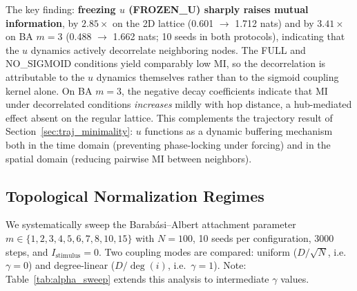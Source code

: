 ﻿\documentclass[11pt]{article}
\begin{document}
The key finding: \textbf{freezing $u$ (FROZEN\_U) sharply raises mutual information}, by $2.85\times$ on the 2D lattice (0.601 $\to$ 1.712 nats) and by $3.41\times$ on BA $m=3$ (0.488 $\to$ 1.662 nats; 10 seeds in both protocols), indicating that the $u$ dynamics actively decorrelate neighboring nodes. The FULL and NO\_SIGMOID conditions yield comparably low MI, so the decorrelation is attributable to the $u$ dynamics themselves rather than to the sigmoid coupling kernel alone. On BA $m=3$, the negative decay coefficients indicate that MI under decorrelated conditions \emph{increases} mildly with hop distance, a hub-mediated effect absent on the regular lattice. This complements the trajectory result of Section~\ref{sec:traj_minimality}: $u$ functions as a dynamic buffering mechanism both in the time domain (preventing phase-locking under forcing) and in the spatial domain (reducing pairwise MI between neighbors).

\subsection{Topological Normalization Regimes}
\label{sec:topo_regimes}

We systematically sweep the Barab\'asi--Albert attachment parameter $m \in \{1, 2, 3, 4, 5, 6, 7, 8, 10, 15\}$ with $N = 100$, 10 seeds per configuration, 3000 steps, and $I_{\text{stimulus}} = 0$. Two coupling modes are compared: uniform ($D/\sqrt{N}$, i.e.\ $\gamma = 0$) and degree-linear ($D/\deg(i)$, i.e.\ $\gamma = 1$). Note: Table~\ref{tab:alpha_sweep} extends this analysis to intermediate $\gamma$ values.
\end{document}
